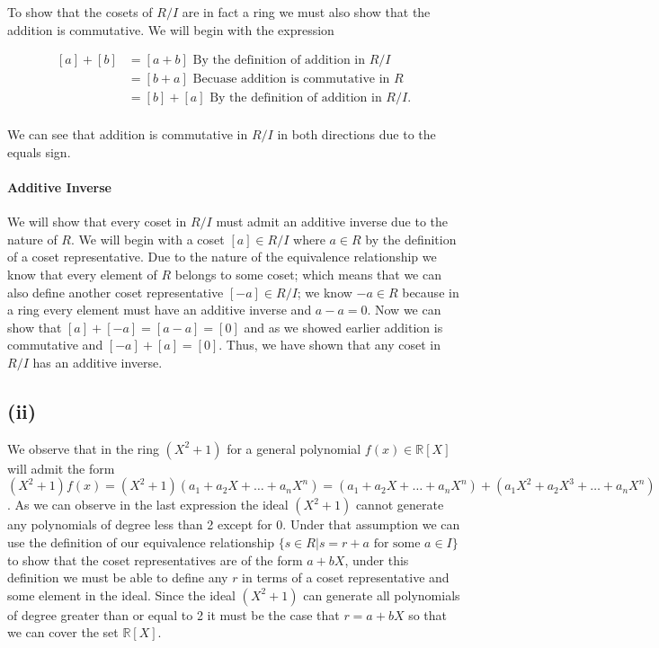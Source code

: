 \documentclass{article}
\begin{document}
      To show that the cosets of $R/I$ are in fact a ring we must also show that the addition is commutative. We will begin with the expression 

      \[
        \begin{split}
          [a] + [b] &= [a+b] \text{ By the definition of addition in } R/I\\
          &= [b+a] \text{ Becuase addition is commutative in } R\\
          &= [b] + [a] \text{ By the definition of addition in } R/I.\\
        \end{split}
      \]

      We can see that addition is commutative in $R/I$ in both directions due to the equals sign. 
      
      \paragraph{Additive Inverse} We will show that every coset in $R/I$ must admit an additive inverse due to the nature of $R$. We will begin with a coset $[a] \in R/I$ where $a \in R$ by the definition of a coset representative. Due to the nature of the equivalence relationship we know that every element of $R$ belongs to some coset; which means that we can also define another coset representative $[-a] \in R/I$; we know $-a \in R$ because in a ring every element must have an additive inverse and $a-a = 0$. Now we can show that $[a] + [-a] = [a-a] = [0]$ and as we showed earlier addition is commutative and $[-a] + [a] = [0]$. Thus, we have shown that any coset in $R/I$ has an additive inverse.

    \subsection*{(ii)}
    We observe that in the ring $(X^2 + 1)$ for a general polynomial $f(x) \in \mathbb{R}[X]$ will admit the form $(X^2 + 1)f(x) = (X^2+1)(a_1 + a_2X + \dots + a_nX^n) = (a_1 + a_2X + \dots + a_nX^n) + (a_1X^2 + a_2X^3 + \dots + a_nX^n)$. As we can observe in the last expression the ideal $(X^2 + 1)$ cannot generate any polynomials of degree less than 2 except for 0. Under that assumption we can use the definition of our equivalence relationship $\{s \in R | s = r + a \text{ for some } a \in I\}$  to show that the coset representatives are of the form $a +bX$, under this definition we must be able to define any $r$ in terms of a coset representative and some element in the ideal. Since the ideal $(X^2 + 1)$ can generate all polynomials of degree greater than or equal to 2 it must be the case that $r = a + bX$ so that we can cover the set $\mathbb{R}[X]$.
\end{document}
